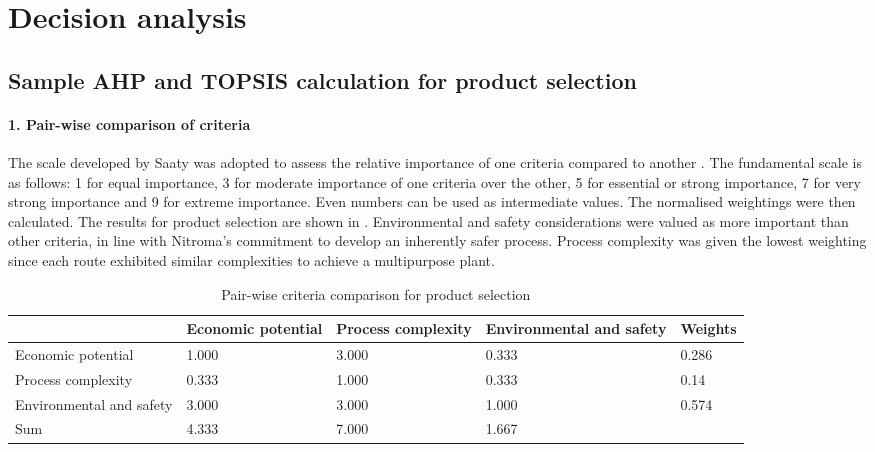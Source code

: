 \section{Decision analysis}
\label{app:matrix}

\subsection{Sample AHP and TOPSIS calculation for product selection}

\paragraph{1. Pair-wise comparison of criteria}
The scale developed by Saaty was adopted to assess the relative importance of one criteria compared to another \cite{saaty_analytic_1987}. The fundamental scale is as follows: 1 for equal importance, 3 for moderate importance of one criteria over the other, 5 for essential or strong importance, 7 for very strong importance and 9 for extreme importance. Even numbers can be used as intermediate values. The normalised weightings were then calculated. The results for product selection are shown in . Environmental and safety considerations were valued as more important than other criteria, in line with Nitroma's commitment to develop an inherently safer process. Process complexity was given the lowest weighting since each route exhibited similar complexities to achieve a multipurpose plant.  

\begin{table}[H]
\centering
\caption{Pair-wise criteria comparison for product selection}
\label{tab:pairwise}
\begin{tabularx}{\linewidth}{l|XXX|l}
\toprule
                                                                & Economic potential & Process complexity & Environmental and safety & Weights \\ \midrule
Economic potential                        & 1.000              & 3.000              & 0.333                    & 0.286   \\
Process complexity                      & 0.333              & 1.000              & 0.333                    & 0.14    \\
Environmental and   safety & 3.000              & 3.000              & 1.000                    & 0.574   \\ \midrule
Sum                                      & 4.333              & 7.000              & 1.667                    &                              \\ \bottomrule
\end{tabularx}
\end{table}


